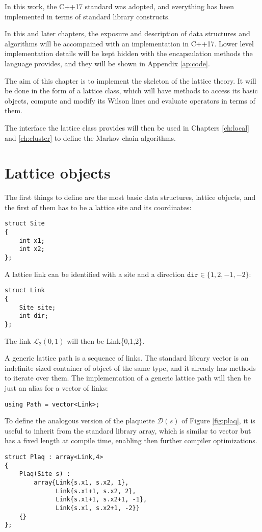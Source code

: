 In this work, the C++17 standard was adopted,
and everything has been implemented in terms of standard library constructs.

In this and later chapters, the exposure and description of data structures and algorithms will be accompained with an implementation in C++17.
Lower level implementation details will be kept hidden with the encapsulation methods the language provides,
and they will be shown in Appendix \ref{ap:code}.

The aim of this chapter is to implement the skeleton of the lattice theory.
It will be done in the form of a lattice class, which will have methods to access its basic objects,
compute and modify its Wilson lines and evaluate operators in terms of them.

The interface the lattice class provides will then be used in Chapters \ref{ch:local} and \ref{ch:cluster} to define the Markov chain algorithms.

\section{Lattice objects}

The first things to define are the most basic data structures, \ie lattice objects,
and the first of them has to be a lattice site and its coordinates:
\begin{lstlisting}[caption={Lattice site}]
struct Site
{
    int x1;
    int x2;
};
\end{lstlisting}
A lattice link can be identified with a site and a direction $\mathtt{dir} \in \{1,2,-1,-2\}$:
\begin{lstlisting}[caption={Lattice link}]
struct Link
{
    Site site;
    int dir;
};
\end{lstlisting}
The link $\mathcal L_2(0,1)$ will then be {\ttfamily Link\{0,1,2\}}.

A generic lattice path is a sequence of links.
The standard library {\ttfamily vector} is an indefinite sized container of object of the same type,
and it already has methods to iterate over them.
The implementation of a generic lattice path will then be just an alias for a vector of links:
\begin{lstlisting}[caption={Lattice path}]
using Path = vector<Link>;
\end{lstlisting}

To define the analogous version of the plaquette $\mathcal D(s)$ of Figure \ref{fig:plaq},
it is useful to inherit from the standard library {\ttfamily array},
which is similar to {\ttfamily vector} but has a fixed length at compile time,
enabling then further compiler optimizations.
\begin{lstlisting}[caption={Lattice plaquette}]
struct Plaq : array<Link,4>
{
    Plaq(Site s) :
        array{Link{s.x1, s.x2, 1},
              Link{s.x1+1, s.x2, 2},
              Link{s.x1+1, s.x2+1, -1},
              Link{s.x1, s.x2+1, -2}}
    {}
};
\end{lstlisting}


